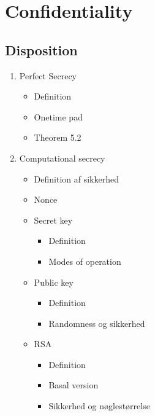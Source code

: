 \documentclass[a4, english]{article}
\author{Martin Nørskov Jensen}
\begin{document}
\maketitle

\newpage    
\tableofcontents
\newpage

\section{Confidentiality}
\subsection{Disposition}
\begin{enumerate}
	\item Perfect Secrecy
  \begin{itemize}
  	\item Definition
    \item Onetime pad
    \item Theorem 5.2
  \end{itemize}
  \item Computational secrecy
  \begin{itemize}
  	\item Definition af sikkerhed
    \item Nonce
    \item Secret key
    \begin{itemize}
    	\item Definition
      \item Modes of operation
    \end{itemize}
    \item Public key
    \begin{itemize}
    	\item Definition
      \item Randomness og sikkerhed
    \end{itemize}
    \item RSA
    \begin{itemize}
    	\item Definition
      \item Basal version
      \item Sikkerhed og nøglestørrelse
    \end{itemize}
  \end{itemize}
\end{enumerate}
\newpage
\end{document}
